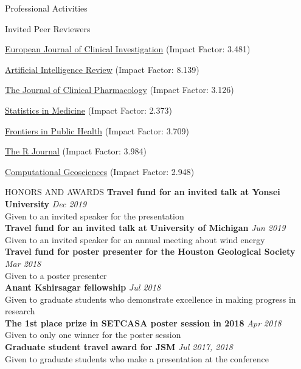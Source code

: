 \documentclass{resume} %
\begin{document}
\begin{rSection}{Professional Activities}
\begin{rSubsection}{
Invited Peer Reviewers}{}{}{}
\item \href{https://onlinelibrary.wiley.com/journal/13652362}{European Journal of Clinical Investigation} (Impact Factor: 3.481)
\item \href{https://www.springer.com/journal/10462}{Artificial Intelligence Review} (Impact Factor: 8.139)
\item \href{https://accp1.onlinelibrary.wiley.com/journal/15524604}{The Journal of Clinical Pharmacology} (Impact Factor: 3.126)
\item \href{https://onlinelibrary.wiley.com/journal/10970258}{Statistics in Medicine} (Impact Factor: 2.373)
\item \href{https://www.frontiersin.org/journals/public-health}{Frontiers in Public Health} (Impact Factor: 3.709)
\item \href{https://journal.r-project.org/}{The R Journal} (Impact Factor: 3.984)
\item \href{https://www.springer.com/journal/10596}{Computational Geosciences} (Impact Factor: 2.948)
\end{rSubsection}
\end{rSection}


\begin{rSection}{HONORS AND AWARDS}
{\bf Travel fund for an invited talk at Yonsei University} \hfill {\em Dec 2019} \\ 
Given to an invited speaker for the presentation
\\
{\bf Travel fund for an invited talk at University of Michigan} \hfill {\em Jun 2019} \\ 
Given to an invited speaker for an annual meeting about wind energy
\\
{\bf Travel fund for poster presenter for the Houston Geological Society} \hfill {\em Mar 2018} \\ 
Given to a poster presenter 
\\
{\bf Anant Kshirsagar fellowship} \hfill {\em Jul 2018} \\ 
Given to graduate students who demonstrate excellence in making progress in research
\\
{\bf The 1st place prize in SETCASA poster session in 2018 } \hfill {\em Apr 2018} \\ 
Given to only one winner for the poster session 
\\
{\bf Graduate student travel award for JSM} \hfill {\em Jul 2017, 2018} \\ 
Given to graduate students who make a presentation at the conference
\end{rSection}
\end{document}
